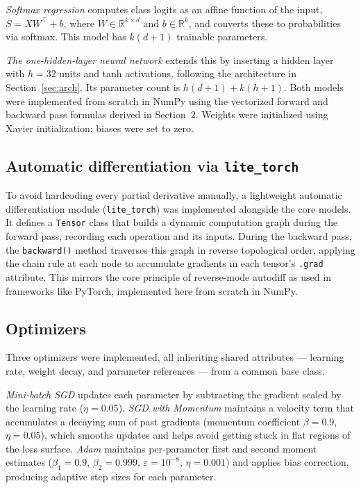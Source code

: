 \documentclass[11pt]{article}
\begin{document}
\emph{Softmax regression} computes class logits as an affine function of the input,
$S = XW^\top + b$, where $W \in \mathbb{R}^{k \times d}$ and $b \in \mathbb{R}^k$,
and converts these to probabilities via softmax. This model has $k(d+1)$ trainable
parameters.

\emph{The one-hidden-layer neural network} extends this by inserting a hidden layer
with $h = 32$ units and tanh activations, following the architecture in
Section~\ref{sec:arch}. Its parameter count is $h(d+1) + k(h+1)$. Both models were
implemented from scratch in NumPy using the vectorized forward and backward pass
formulas derived in Section~2. Weights were initialized using Xavier initialization;
biases were set to zero.

\subsection{Automatic differentiation via \texttt{lite\_torch}}

To avoid hardcoding every partial derivative manually, a lightweight automatic
differentiation module (\texttt{lite\_torch}) was implemented alongside the core
models. It defines a \texttt{Tensor} class that builds a dynamic computation graph
during the forward pass, recording each operation and its inputs. During the backward
pass, the \texttt{backward()} method traverses this graph in reverse topological order,
applying the chain rule at each node to accumulate gradients in each tensor's
\texttt{.grad} attribute. This mirrors the core principle of reverse-mode autodiff as
used in frameworks like PyTorch, implemented here from scratch in NumPy.

\subsection{Optimizers}

Three optimizers were implemented, all inheriting shared attributes --- learning rate,
weight decay, and parameter references --- from a common base class.

\emph{Mini-batch SGD} updates each parameter by subtracting the gradient scaled by
the learning rate ($\eta = 0.05$). \emph{SGD with Momentum} maintains a velocity term
that accumulates a decaying sum of past gradients (momentum coefficient $\beta = 0.9$,
$\eta = 0.05$), which smooths updates and helps avoid getting stuck in flat regions of
the loss surface. \emph{Adam} maintains per-parameter first and second moment estimates
($\beta_1 = 0.9$, $\beta_2 = 0.999$, $\varepsilon = 10^{-8}$, $\eta = 0.001$) and
applies bias correction, producing adaptive step sizes for each parameter.
\end{document}
